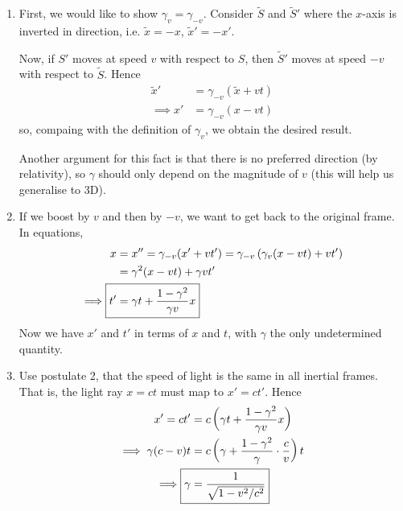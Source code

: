 \documentclass{../template/note}
\begin{document}
    \begin{enumerate}[label=\protect\circled{\arabic*}]
        \item First, we would like to show \(\gamma_v = \gamma_{-v}\). Consider \(\tilde S\) and \(\tilde S'\) where the \(x\)-axis is inverted in direction, i.e. \(\tilde x = -x\), \(\tilde x' = -x'\).
        
        Now, if \(S'\) moves at speed \(v\) with respect to \(S\), then \(\tilde S'\) moves at speed \(-v\) with respect to \(\tilde S\). Hence
        \begin{align*}
            \tilde x' &= \gamma_{-v} (\tilde x + vt) \\
            \implies x' &= \gamma_{-v} (x - vt)
        \end{align*}
        so, compaing with the definition of \(\gamma_v\), we obtain the desired result.
        
        Another argument for this fact is that there is no preferred direction (by relativity), so \(\gamma\) should only depend on the magnitude of \(v\) (this will help us generalise to 3D).

        \item If we boost by \(v\) and then by \(-v\), we want to get back to the original frame. In equations,
        \begin{align*}
            x &= x'' = \gamma_{-v}(x' + vt') = \gamma_{-v}\left(\gamma_v(x-vt)+vt'\right) \\
            &= \gamma^2(x-vt) + \gamma vt' \\
            \implies \Aboxed{t' &= \gamma t + \frac{1-\gamma^2}{\gamma v}x}
        \end{align*}
        Now we have \(x'\) and \(t'\) in terms of \(x\) and \(t\), with \(\gamma\) the only undetermined quantity.

        \item Use postulate 2, that the speed of light is the same in all inertial frames. That is, the light ray \(x = ct\) must map to \(x'=ct'\). Hence
        \begin{align*}
            x' = ct' &= c\left(\gamma t + \frac{1-\gamma^2}{\gamma v}x\right) \\
            \implies \gamma(c-v)t &= c\left(\gamma + \frac{1-\gamma^2}{\gamma} \cdot \frac c v\right)t \\
            \implies \Aboxed{\gamma &= \frac 1 {\sqrt{1-v^2/c^2}}}
        \end{align*}
    \end{enumerate}
    
\end{document}

